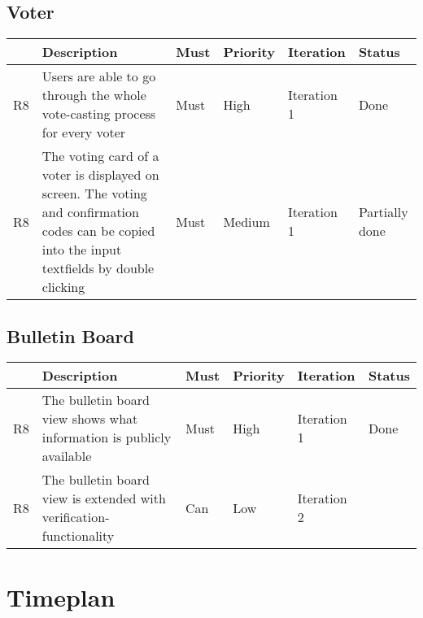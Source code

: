\subsection{Voter}
\begin{longtable}{p{0.4cm}p{9cm}p{1cm}p{1cm}p{1cm}p{1cm}}
\hline
 & Description & Must & Priority & Iteration & Status\\
\hline
R8 & Users are able to go through the whole vote-casting process for every voter & Must & High & Iteration 1 & Done\\
R8 & The voting card of a voter is displayed on screen. The voting and confirmation codes can be copied into the input textfields by double clicking & Must & Medium & Iteration 1 & Partially done \\
\end{longtable}


\subsection{Bulletin Board}
\begin{longtable}{p{0.4cm}p{9cm}p{1cm}p{1cm}p{1cm}p{1cm}}
\hline
 & Description & Must & Priority & Iteration & Status\\
\hline
R8 & The bulletin board view shows what information is publicly available & Must & High & Iteration 1 & Done\\
R8 & The bulletin board view is extended with verification-functionality & Can & Low & Iteration 2 & \\
\end{longtable}


\section{Timeplan}

